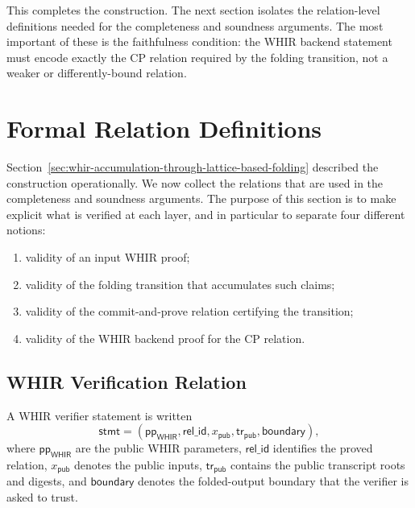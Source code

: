 \documentclass[11pt]{article}
\theoremstyle{definition}
\newcommand{\WHIR}{\mathsf{WHIR}}
\begin{document}
This completes the construction. The next section isolates the relation-level
definitions needed for the completeness and soundness arguments. The most
important of these is the faithfulness condition: the WHIR backend statement
must encode exactly the CP relation required by the folding transition, not a
weaker or differently-bound relation.

\section{Formal Relation Definitions}
\label{sec:formal-relations}

Section~\ref{sec:whir-accumulation-through-lattice-based-folding} described the construction operationally. We now collect the relations
that are used in the completeness and soundness arguments. The purpose of this
section is to make explicit what is verified at each layer, and in particular to
separate four different notions:
\begin{enumerate}
  \item validity of an input WHIR proof;
  \item validity of the folding transition that accumulates such claims;
  \item validity of the commit-and-prove relation certifying the transition;
  \item validity of the WHIR backend proof for the CP relation.
\end{enumerate}

\subsection{WHIR Verification Relation}
A WHIR verifier statement is written
\[
  \mathsf{stmt}
  =
  \left(
    \mathsf{pp}_{\WHIR},
    \mathsf{rel\_id},
    x_{\mathsf{pub}},
    \mathsf{tr}_{\mathsf{pub}},
    \mathsf{boundary}
  \right),
\]
where $\mathsf{pp}_{\WHIR}$ are the public WHIR parameters,
$\mathsf{rel\_id}$ identifies the proved relation, $x_{\mathsf{pub}}$ denotes
the public inputs, $\mathsf{tr}_{\mathsf{pub}}$ contains the public transcript
roots and digests, and $\mathsf{boundary}$ denotes the folded-output boundary
that the verifier is asked to trust.
\end{document}
